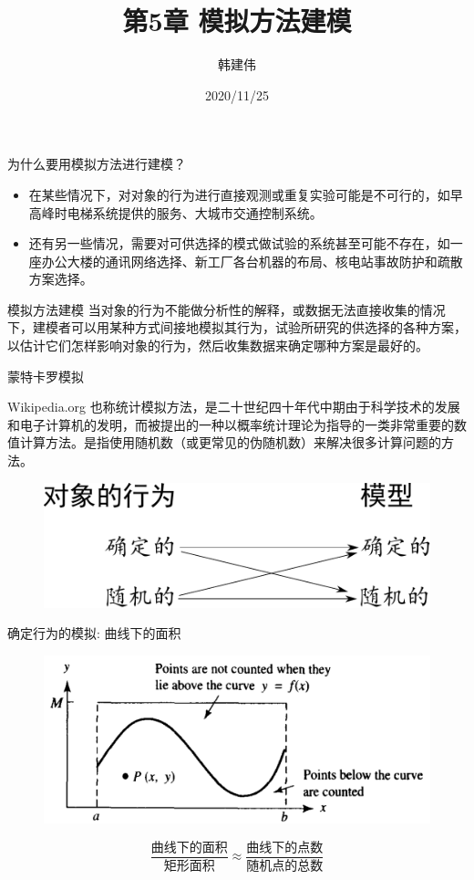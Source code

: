 \documentclass[UTF8]{ctexbeamer}
\title{第5章 模拟方法建模}
\author{韩建伟}
\institute{
  信息学院\\
  \texttt{hanjianwei@zjgsu.edu.cn}
}
\date{2020/11/25}
\begin{document}
\begin{frame}[plain]
  \titlepage{}
\end{frame}

\begin{frame}{为什么要用模拟方法进行建模？}

  \begin{itemize}
  \item 在某些情况下，对对象的行为进行直接观测或重复实验可能是不可行的，如早高峰时电梯系统提供的服务、大城市交通控制系统。
  \item 还有另一些情况，需要对可供选择的模式做试验的系统甚至可能不存在，如一座办公大楼的通讯网络选择、新工厂各台机器的布局、核电站事故防护和疏散方案选择。
  \end{itemize}

  \begin{block}{模拟方法建模}
    当对象的行为不能做分析性的解释，或数据无法直接收集的情况下，建模者可以用某种方式间接地模拟其行为，试验所研究的供选择的各种方案，以估计它们怎样影响对象的行为，然后收集数据来确定哪种方案是最好的。
  \end{block}
\end{frame}

\begin{frame}{蒙特卡罗模拟}
  \begin{block}{Wikipedia.org}
    也称统计模拟方法，是二十世纪四十年代中期由于科学技术的发展和电子计算机的发明，而被提出的一种以概率统计理论为指导的一类非常重要的数值计算方法。是指使用随机数（或更常见的伪随机数）来解决很多计算问题的方法。
  \end{block}

  \begin{figure}
    \centering
    \includegraphics[width=.7\textwidth{}]{action-model.pdf}
  \end{figure}
\end{frame}

\begin{frame}{确定行为的模拟: 曲线下的面积}
  \begin{figure}
    \centering
    \includegraphics[width=.7\textwidth{}]{curve.png}
  \end{figure}

  \[
  \frac{\text{曲线下的面积}}{\text{矩形面积}} \approx \frac{\text{曲线下的点数}}{\text{随机点的总数}}
  \]
  
\end{frame}
\end{document}

